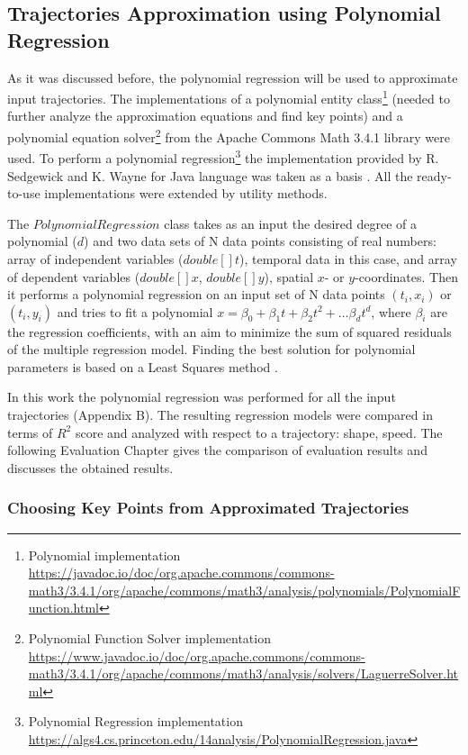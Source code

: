 \subsection{Trajectories Approximation using Polynomial Regression}

As it was discussed before, the polynomial regression will be used to approximate input trajectories. The implementations of a polynomial entity class\footnote{Polynomial implementation \url{https://javadoc.io/doc/org.apache.commons/commons-math3/3.4.1/org/apache/commons/math3/analysis/polynomials/PolynomialFunction.html}} (needed to further analyze the approximation equations and find key points) and a polynomial equation solver\footnote{Polynomial Function Solver implementation \url{https://www.javadoc.io/doc/org.apache.commons/commons-math3/3.4.1/org/apache/commons/math3/analysis/solvers/LaguerreSolver.html}} from the Apache Commons Math 3.4.1 library were used. To perform a polynomial regression\footnote{Polynomial Regression implementation \url{https://algs4.cs.princeton.edu/14analysis/PolynomialRegression.java}} the implementation provided by R. Sedgewick and K. Wayne for Java language was taken as a basis \cite{online:polynomial_impl}. All the ready-to-use implementations were extended by utility methods.

The $PolynomialRegression$ class takes as an input the desired degree of a polynomial ($d$) and two data sets of N data points consisting of real numbers: array of independent variables ($double[] t$), temporal data in this case, and array of dependent variables ($double[] x$, $double[] y$), spatial $x$- or $y$-coordinates. Then it performs a polynomial regression on an input set of N data points $(t_i, x_i)$ or $(t_i, y_i)$ and tries to fit a polynomial $x = \beta_0 + \beta_1t + \beta_2t^2 + \ldots \beta_dt^d$, where $\beta_i$ are the regression coefficients, with an aim to minimize the sum of squared residuals of the multiple regression model. Finding the best solution for polynomial parameters is based on a Least Squares method \cite{article:behav_form_extr}.

In this work the polynomial regression was performed for all the input trajectories (Appendix B). The resulting regression models were compared in terms of $R^2$ score and analyzed with respect to a trajectory: shape, speed. The following Evaluation Chapter gives the comparison of evaluation results and discusses the obtained results.

\subsubsection{Choosing Key Points from Approximated Trajectories}


